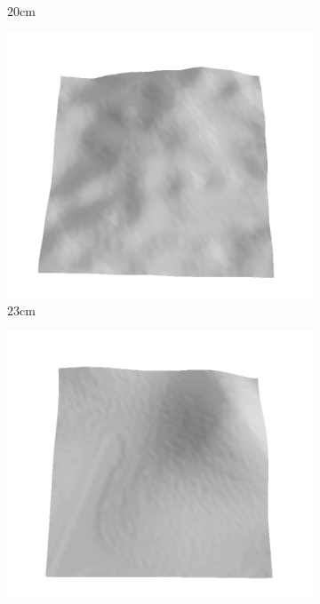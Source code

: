\documentclass[../document.tex]{subfiles}
\begin{document}
\begin{figure}[htbp]
\begin{subfigure}[b]{0.19\textwidth}
    \caption{$20$cm}
    \end{subfigure}
    \begin{subfigure}[b]{0.19\textwidth}
    \includegraphics[width=\linewidth]{../img/5/train/all/23-patch-3d-majavi-14.png}
    \caption{$23$cm}
    \end{subfigure}
    \begin{subfigure}[b]{0.19\textwidth}
    \includegraphics[width=\linewidth]{../img/5/train/all/26-patch-3d-majavi-15.png}

\end{subfigure}
\end{figure}
\end{document}
